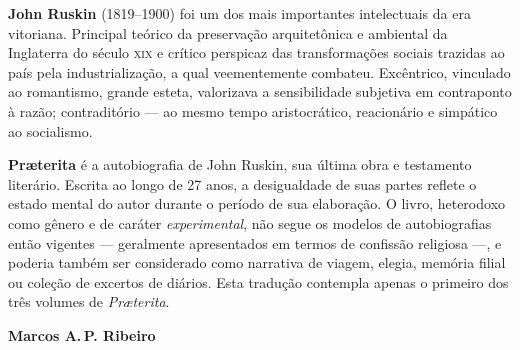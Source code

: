 \textbf{John Ruskin} (1819--1900) foi um dos mais importantes intelectuais da era vitoriana. Principal teórico da preservação arquitetônica e ambiental da Inglaterra do século \textsc{xix} e crítico perspicaz das transformações sociais trazidas ao país pela industrialização, a qual veementemente combateu. Excêntrico, vinculado ao romantismo, grande esteta, valorizava a sensibilidade subjetiva em contraponto à razão; contraditório --- ao mesmo tempo aristocrático, reacionário e simpático ao socialismo.

\textbf{Pr\ae terita} é a autobiografia de John Ruskin, sua última obra e testamento literário. Escrita ao longo de 27 anos, a desigualdade de suas partes reflete o estado mental do autor durante o período de sua elaboração. O livro, heterodoxo como gênero e de caráter \textit{experimental}, não segue os modelos de autobiografias então vigentes --- geralmente apresentados em termos de confissão religiosa ---, e poderia também ser considerado como narrativa de viagem, elegia, memória filial ou coleção de excertos de diários. Esta tradução contempla apenas o primeiro dos três volumes de \textit{Pr\ae terita}.

\textbf{Marcos A.\,P. Ribeiro} \lipsum[3]





